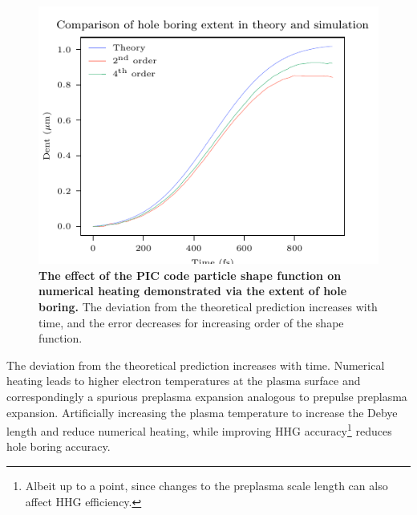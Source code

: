 \begin{figure}
	\centering
	\includegraphics{figures/orion/orion_compare_ion_denting_to_theory}
	\caption[The effect of the PIC code particle shape function on numerical heating.]{\textbf{The effect of the PIC code particle shape function on numerical heating demonstrated via the extent of hole boring.} The deviation from the theoretical prediction increases with time, and the error decreases for increasing order of the shape function.}
	\label{fig:orioncompareiondentingtotheory}
\end{figure}
The deviation from the theoretical prediction increases with time. Numerical heating leads to higher electron temperatures at the plasma surface and correspondingly a spurious preplasma expansion analogous to prepulse preplasma expansion. Artificially increasing the plasma temperature to increase the Debye length and reduce numerical heating, while improving HHG accuracy\footnote{Albeit up to a point, since changes to the preplasma scale length can also affect HHG efficiency.} reduces hole boring accuracy.

